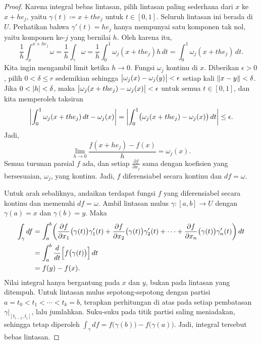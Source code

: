 \begin{proof}
Karena integral bebas lintasan, pilih lintasan paling sederhana dari $x$ ke
$x+he_j$, yaitu $\gamma(t) \coloneqq x+t he_j$ untuk $t \in [0,1]$.
Seluruh lintasan ini berada di $U$. Perhatikan bahwa
$\gamma'(t) = h e_j$ hanya mempunyai satu komponen tak nol, yaitu komponen
ke-$j$ yang bernilai $h$. Oleh karena itu,
\begin{equation*}
\frac{1}{h} \int_{x}^{x+he_j} \omega 
=
\frac{1}{h} \int_{\gamma} \omega 
=
\frac{1}{h} \int_0^1 \omega_j(x+the_j) h \, dt 
=
\int_0^1 \omega_j(x+the_j) \, dt  .
\end{equation*}
Kita ingin mengambil limit ketika $h \to 0$. Fungsi $\omega_j$ kontinu di
$x$. Diberikan $\epsilon > 0$, pilih $0<\delta\leq r$ sedemikian sehingga
$\bigl\lvert {\omega_j(x)-\omega_j(y)} \bigr\rvert < \epsilon$ setiap kali
$\lVert {x-y} \rVert<\delta$. Jika $0<\lvert {h} \rvert<\delta$, maka
$\bigl\lvert {\omega_j(x+the_j)-\omega_j(x)} \bigr\rvert < \epsilon$ untuk semua
$t \in [0,1]$, dan kita memperoleh taksiran
\begin{equation*}
\left\lvert {\int_0^1 \omega_j(x+the_j) \, dt  - \omega_j(x)} \right\rvert
=
\left\lvert {\int_0^1 \bigl( \omega_j(x+the_j) - \omega_j(x) \bigr) \, dt} \right\rvert
\leq
\epsilon .
\end{equation*}
Jadi,
\begin{equation*}
\lim_{h\to 0}\frac{f(x+h e_j) - f(x)}{h} = \omega_j(x) .
\end{equation*}
Semua turunan parsial $f$ ada, dan setiap
$\frac{\partial f}{\partial x_j}$ sama dengan koefisien yang bersesuaian,
$\omega_j$, yang kontinu. Jadi, $f$ diferensiabel secara kontinu dan
$df = \omega$.

Untuk arah sebaliknya, andaikan terdapat fungsi $f$ yang diferensiabel secara
kontinu dan memenuhi $df = \omega$. Ambil lintasan mulus
$\gamma \colon [a,b] \to U$ dengan $\gamma(a) = x$ dan
$\gamma(b) = y$. Maka
\begin{equation*}
\begin{split}
\int_\gamma df
& =
\int_a^b
\biggl(
\frac{\partial f}{\partial x_1}\bigl(\gamma(t)\bigr) \gamma_1'(t)+
\frac{\partial f}{\partial x_2}\bigl(\gamma(t)\bigr) \gamma_2'(t)+ \cdots +
\frac{\partial f}{\partial x_n}\bigl(\gamma(t)\bigr) \gamma_n'(t)
\biggr) \, dt
\\
& = 
\int_a^b
\frac{d}{dt} \Bigl[ f\bigl(\gamma(t)\bigr) \Bigr]\, dt
\\
& = f(y)-f(x) .
\end{split}
\end{equation*}
Nilai integral hanya bergantung pada $x$ dan $y$, bukan pada lintasan yang
ditempuh. Untuk lintasan mulus sepotong-sepotong dengan partisi
$a=t_0<t_1<\cdots<t_k=b$, terapkan perhitungan di atas pada setiap pembatasan
$\gamma|_{[t_{i-1},t_i]}$, lalu jumlahkan. Suku-suku pada titik partisi saling
meniadakan, sehingga tetap diperoleh
$\int_\gamma df=f\bigl(\gamma(b)\bigr)-f\bigl(\gamma(a)\bigr)$. Jadi, integral
tersebut bebas lintasan.
\end{proof}

